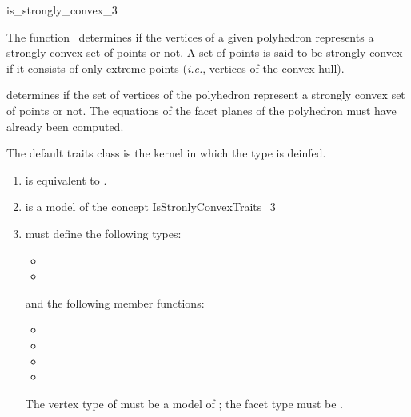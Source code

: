 \begin{ccRefFunction}{is_strongly_convex_3}

\ccDefinition

The function \ccRefName\ determines if the vertices of a given polyhedron 
represents a strongly convex set of points or not.  A set of points is said 
to be strongly convex if it consists of only extreme points (\textit{i.e.}, 
vertices of the convex hull).


{
determines if the set of vertices of the polyhedron  represent
a strongly convex set of points or not.
\ccPrecond%
The equations of the facet planes of the polyhedron must have
already been computed.
}

The default traits class is the kernel in which the type 
 is deinfed.

\begin{enumerate}
   \item {} is equivalent to .
   \item {} is a model of the concept IsStronlyConvexTraits\_3
  \item {} must define the following types:
        \begin{itemize}
          \item {}
          \item {}
        \end{itemize}
        and the following member functions:
        \begin{itemize}
          \item {}
          \item {}
          \item {}
          \item {}
        \end{itemize}
        The vertex type of  must be a model of
        ;
        the facet type must be .
\end{enumerate}



\end{ccRefFunction}
